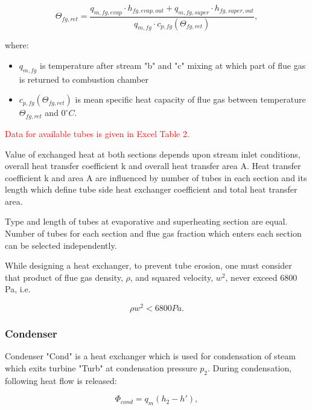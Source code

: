 \documentclass{article}
\begin{document}
	\begin{equation}\label{eq:outlet_temp}
		\Theta_{fg,ret} = \frac{q_{m,fg,evap} \cdot h_{fg,evap,out} + q_{m,fg,super} \cdot h_{fg,super,out}}{q_{m,fg} \cdot c_{p,fg} (\Theta_{fg,ret})},
	\end{equation}
	
	\noindent
	where:
	
	\begin{itemize}
		\item $q_{m,fg}$ is temperature after stream "b" and "c" mixing at which part of flue gas is returned to combustion chamber
		\item $c_{p,fg} (\Theta_{fg,ret})$ is mean specific heat capacity of flue gas between temperature $\Theta_{fg,ret}$ and $0^{\circ}C$.
	\end{itemize}
	
	\noindent
	\textcolor{red}{Data for available tubes is given in Excel Table 2.}
	
	\noindent
	Value of exchanged heat at both sections depends upon stream inlet conditions, overall heat transfer coefficient k and overall heat transfer area A. Heat transfer coefficient k and area A are influenced by number of tubes in each section and its length which define tube side heat exchanger coefficient and total heat transfer area.
	
	Type and length of tubes at evaporative and superheating section are equal. Number of tubes for each section and flue gas fraction which enters each section can be selected independently.  
	
	While designing a heat exchanger, to prevent tube erosion, one must 
	consider that product of flue gas density, $\rho$, and squared velocity, 
	$w^2$, never exceed $6800$  Pa,  i.e. 
	
	\begin{equation}\label{eq:flue_gas_density}
		\rho w^2 < 6800 Pa.
	\end{equation}
	
	\subsubsection*{Condenser}
	
	\noindent
	Condenser "Cond" is a heat exchanger which is used for condensation of steam which exits turbine "Turb" at condensation pressure $p_2$. During condensation, following heat flow is released:
	
	\begin{equation}\label{eq:heat_flow_cond}
		\Phi_{cond} = q_m (h_2 - h'),
	\end{equation}
	
\end{document}
